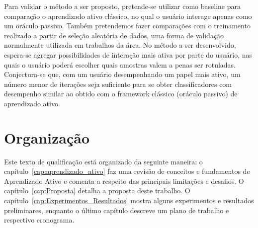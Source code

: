 Para validar o método a ser proposto, pretende-se utilizar como baseline para comparação o aprendizado ativo clássico, no qual o usuário interage apenas como um oráculo passivo. Também pretendemos fazer comparações com o treinamento realizado a partir de seleção aleatória de dados, uma forma de validação normalmente utilizada em trabalhos da área. No método a ser desenvolvido, espera-se agregar possibilidades de interação mais ativa por parte do usuário, nas quais o usuário poderá escolher quais amostras valem a penas ser rotuladas. Conjectura-se que, com um usuário desempenhando um papel mais ativo, um número menor de iterações seja suficiente para se obter classificadores com desempenho similar ao obtido com o framework clássico (oráculo passivo) de aprendizado ativo.




\section{Organização}
\label{sec:intro_organizacao}

Este texto de qualificação está organizado da seguinte maneira: o capítulo~\ref{cap:aprendizado_ativo} faz uma revisão de conceitos e fundamentos de Aprendizado Ativo e comenta a respeito das principais limitações e desafios. O capítulo~\ref{cap:Proposta} detalha a proposta deste trabalho. O capítulo~\ref{cap:Experimentos_Resultados} mostra alguns experimentos e resultados preliminares, enquanto o último capítulo descreve um plano de trabalho e respectivo cronograma.